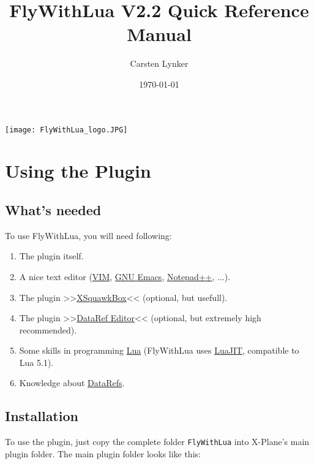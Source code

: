 \documentclass[11pt,parskip=half,a4paper]{scrartcl}
\begin{document}
\title{FlyWithLua V2.2 Quick Reference Manual}
\author{Carsten Lynker}
\date{\today}

\maketitle
\vspace{2cm}

\begin{center}
\texttt{[image: FlyWithLua\_logo.JPG]}
\end{center}
\thispagestyle{empty}
\newpage
\verb||
\tableofcontents

\newpage
\section{Using the Plugin}
\subsection{What's needed}

To use FlyWithLua, you will need following:

\begin{enumerate}
\item The plugin itself.
\item A nice text editor (\href{http://www.vim.org/}{VIM}, \href{http://www.gnu.org/software/emacs/}{GNU Emacs}, \href{http://notepad-plus-plus.org/}{Notepad++}, ...).
\item The plugin >>\href{http://www.xsquawkbox.net/xsb/}{XSquawkBox}<< (optional, but usefull).
\item The plugin >>\href{http://wiki.x-plane.com/DataRefEditor}{DataRef Editor}<< (optional, but extremely high recommended).
\item Some skills in programming \href{http://www.lua.org}{Lua} (FlyWithLua uses \href{http://luajit.org/}{LuaJIT}, compatible to Lua 5.1).
\item Knowledge about \href{http://www.xsquawkbox.net/xpsdk/docs/DataRefs.html}{DataRefs}.
\end{enumerate}

\subsection{Installation}

To use the plugin, just copy the complete folder \verb|FlyWithLua| into X-Plane's main plugin folder. The main plugin folder looks like this:
\end{document}
